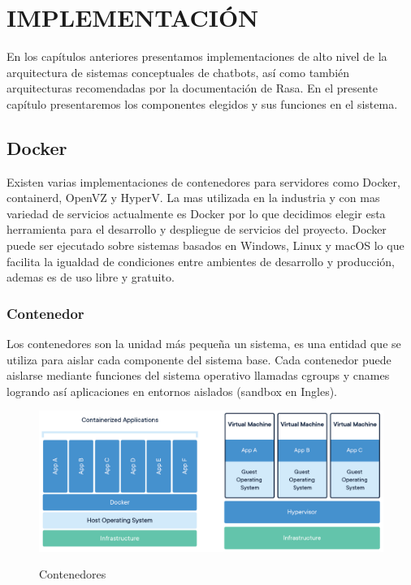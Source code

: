 \chapter[IMPLEMENTACIÓN]{IMPLEMENTACIÓN}
En los capítulos anteriores presentamos implementaciones de alto nivel de la arquitectura de
sistemas conceptuales de chatbots, así como también arquitecturas recomendadas por la documentación
de Rasa. En el presente capítulo presentaremos los componentes elegidos y sus funciones en el
sistema.

\section{Docker}
Existen varias implementaciones de contenedores para servidores como Docker, containerd, OpenVZ y
HyperV. La mas utilizada en la industria y con mas variedad de servicios actualmente es
Docker por lo que decidimos elegir esta herramienta para el desarrollo y despliegue de servicios del
proyecto. Docker puede ser ejecutado sobre sistemas basados en Windows, Linux y macOS lo que
facilita la igualdad de condiciones entre ambientes de desarrollo y producción, ademas es de uso
libre y gratuito. \cite{alternativas_docker}

\subsection{Contenedor}

Los contenedores son la unidad más pequeña un sistema, es una entidad que se utiliza para aislar
cada componente del sistema base. Cada contenedor puede aislarse mediante funciones del sistema
operativo llamadas cgroups y cnames logrando así aplicaciones en entornos aislados (sandbox en
Ingles). \cite{Docker}

\begin{figure}[ht]
	\centering
	\includegraphics[width=\textwidth]{imagenes/cap4/docker-container.png}
	\caption{Contenedores}
	\cite{Docker}
	\label{fig:container_diagram}
\end{figure}

